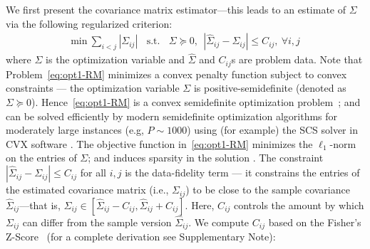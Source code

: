 We first present the \Robocov{} covariance matrix estimator---this leads to an estimate of $\Sigma$ via the following regularized criterion: 
\begin{equation}\label{eq:opt1-RM}
 \begin{aligned}
    \text{min} ~ \sum_{i<j} |\Sigma_{ij}|~~
    ~~\text{s.t.}~~~~\Sigma \succeq 0,~~
   | \hat{\Sigma}_{ij} - \Sigma_{ij} |  \leq  C_{ij},  ~\forall i,j
 \end{aligned}
\end{equation}
where $\Sigma$ is the optimization variable and $\hat{\Sigma}$ and $C_{ij}$s are problem data. Note that Problem~\eqref{eq:opt1-RM} minimizes a convex penalty function subject to convex constraints --- the optimization variable $\Sigma$ is positive-semidefinite (denoted as $\Sigma \succeq 0$). Hence~\eqref{eq:opt1-RM} is a convex semidefinite optimization problem~\cite{BV2004}; and can be solved efficiently by modern semidefinite optimization algorithms for moderately large instances (e.g, $P \sim 1000$) using (for example) the SCS solver in CVX software \cite{BV2004,o2016conic,Boyd2004, Fu2017}.
The objective function in~\eqref{eq:opt1-RM} minimizes the $\ell_{1}$-norm on the entries of $\Sigma$; and induces sparsity in the solution \cite{hastie2015statistical}. 
The constraint $|\hat{\Sigma}_{ij} - \Sigma_{ij}| \leq C_{ij}$ for all $i,j$
is the data-fidelity term --- it constrains the entries of the estimated covariance matrix (i.e., $\Sigma_{ij}$) to be close to the sample covariance $\hat{\Sigma}_{ij}$---that is, 
$\Sigma_{ij} \in [\hat{\Sigma}_{ij} - C_{ij}, \hat{\Sigma}_{ij} + C_{ij}]$. Here, $C_{ij}$ controls the amount by which $\Sigma_{ij}$ can differ from 
the sample version $\hat{\Sigma}_{ij}$. 
We compute $C_{ij}$ based on the Fisher's Z-Score~\cite{fisher1915, fisher1921} (for a complete derivation see Supplementary Note):
